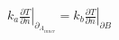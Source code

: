 \begin{gather*}
\left.k_a\frac{\partial T}{\partial n}\right|_{\partial_{A_{inner}}} = \left.k_b\frac{\partial T}{\partial n}\right|_{\partial B}
\end{gather*}

%

